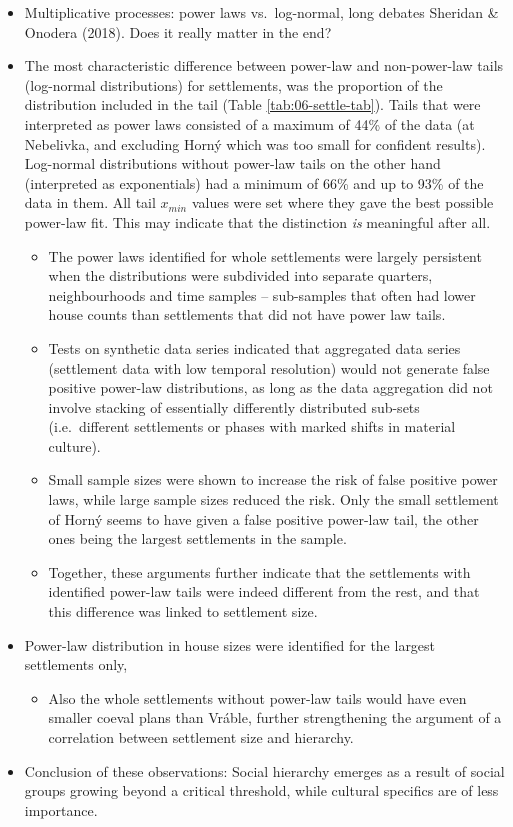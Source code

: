 \documentclass[
  12pt,
]{book}
\providecommand{\tightlist}{%
  \setlength{\itemsep}{0pt}\setlength{\parskip}{0pt}}
\begin{document}
\begin{itemize}
\item
  Multiplicative processes: power laws vs.~log-normal, long debates Sheridan \& Onodera (2018). Does it really matter in the end?
\item
  The most characteristic difference between power-law and non-power-law tails (log-normal distributions) for settlements, was the proportion of the distribution included in the tail (Table \ref{tab:06-settle-tab}). Tails that were interpreted as power laws consisted of a maximum of 44\% of the data (at Nebelivka, and excluding Horný which was too small for confident results). Log-normal distributions without power-law tails on the other hand (interpreted as exponentials) had a minimum of 66\% and up to 93\% of the data in them. All tail \(x_{min}\) values were set where they gave the best possible power-law fit. This may indicate that the distinction \emph{is} meaningful after all.

  \begin{itemize}
  \item
    The power laws identified for whole settlements were largely persistent when the distributions were subdivided into separate quarters, neighbourhoods and time samples -- sub-samples that often had lower house counts than settlements that did not have power law tails.
  \item
    Tests on synthetic data series indicated that aggregated data series (settlement data with low temporal resolution) would not generate false positive power-law distributions, as long as the data aggregation did not involve stacking of essentially differently distributed sub-sets (i.e.~different settlements or phases with marked shifts in material culture).
  \item
    Small sample sizes were shown to increase the risk of false positive power laws, while large sample sizes reduced the risk. Only the small settlement of Horný seems to have given a false positive power-law tail, the other ones being the largest settlements in the sample.
  \item
    Together, these arguments further indicate that the settlements with identified power-law tails were indeed different from the rest, and that this difference was linked to settlement size.
  \end{itemize}
\item
  Power-law distribution in house sizes were identified for the largest settlements only,

  \begin{itemize}
  \tightlist
  \item
    Also the whole settlements without power-law tails would have even smaller coeval plans than Vráble, further strengthening the argument of a correlation between settlement size and hierarchy.
  \end{itemize}
\item
  Conclusion of these observations: Social hierarchy emerges as a result of social groups growing beyond a critical threshold, while cultural specifics are of less importance.


\end{itemize}
\end{document}

